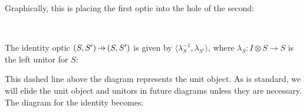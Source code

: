 \documentclass[11pt,a4paper]{article}
\theoremstyle{plain}
\theoremstyle{definition}
\newcommand{\hto}{\ensuremath{\,\mathaccent\shortmid\rightarrow\,}}
\begin{document}
Graphically, this is placing the first optic into the hole of the second:
\begin{center}
  
  \qquad\raisebox{1.5cm}{$\circ$}\qquad
   \\
  \raisebox{1.5cm}{$:=$}\qquad
  
\end{center}

The identity optic $(S, S') \hto (S, S')$ is given by $\langle \lambda^{-1}_S, \lambda_{S'} \rangle$, where $\lambda_S : I \otimes S \to S$ is the left unitor for $S$:
\begin{center}
  
\end{center}
This dashed line above the diagram represents the unit object. As is standard, we will elide the unit object and unitors in future diagrams unless they are necessary. The diagram for the identity becomes:
\begin{center}
  
\end{center}
\end{document}
